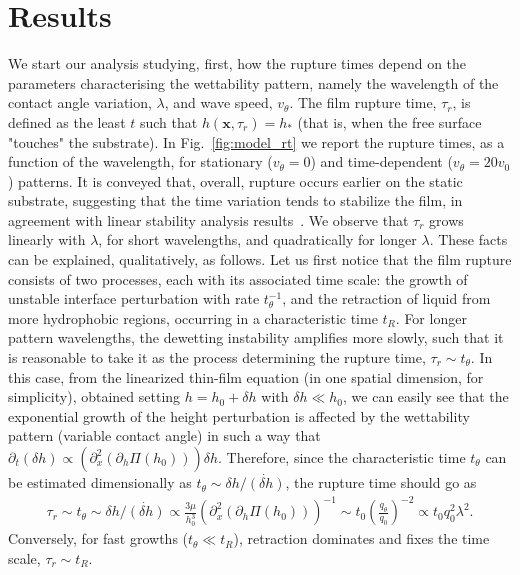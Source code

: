 \section{Results} We start our analysis studying, first, how the rupture times depend on the parameters characterising the wettability pattern, namely the wavelength of the contact angle variation, $\lambda$, and wave speed, $v_{\theta}$.
The film rupture time, $\tau_r$, is defined as the least $t$ such that $h(\mathbf{x},\tau_r)=h_{\ast}$ (that is, when the free surface "touches" the substrate).
In Fig.~\ref{fig:model_rt} we report the rupture times, as a function of the wavelength, for stationary ($v_{\theta}=0$) and time-dependent ($v_{\theta}=20 v_0$) patterns. 
It is conveyed that, overall, rupture occurs earlier on the static substrate, suggesting that the time variation tends to stabilize the film, in agreement with linear stability analysis results~\cite{suman2006dynamics}.
We observe that $\tau_r$ grows linearly with $\lambda$, for short wavelengths, and quadratically for longer $\lambda$.
These facts can be explained, qualitatively, as follows. 
Let us first notice that the film rupture consists of two processes, each with its associated time scale: the growth of unstable interface perturbation with rate $t_{\theta}^{-1}$, and the retraction of liquid from more hydrophobic regions, occurring in a characteristic time $t_R$. For longer pattern wavelengths, the dewetting instability amplifies more slowly, such that it is reasonable to take it as the process determining the rupture time, $\tau_r \sim t_{\theta}$.
In this case, from the linearized thin-film equation (in one spatial dimension, for simplicity), obtained setting $h=h_0 + \delta h$ with $\delta h \ll h_0$, 
we can easily see that the exponential growth of the height perturbation is affected by the wettability pattern (variable contact angle) in such a way that $\partial_t (\delta h) \propto (\partial_x^2 (\partial_h\Pi(h_0))) \delta h$. Therefore, since the characteristic time $t_{\theta}$ can be estimated dimensionally as $t_{\theta} \sim \delta h/\dot{(\delta h)}$, the rupture time should go as
\begin{multline}\label{eq:taur_l2}
    \tau_r \sim t_{\theta} \sim  \delta h/\dot{(\delta h)} \propto \frac{3\mu}{h_0^3}(\partial_x^2 (\partial_h\Pi (h_0)))^{-1} \sim t_0 \left(\frac{q_{\theta}}{q_0}\right)^{-2} \propto t_0 q_0^2 \lambda^2.
\end{multline}
Conversely, for fast growths ($t_{\theta} \ll t_R$), retraction dominates and fixes the time scale, $\tau_r \sim t_R$. 
